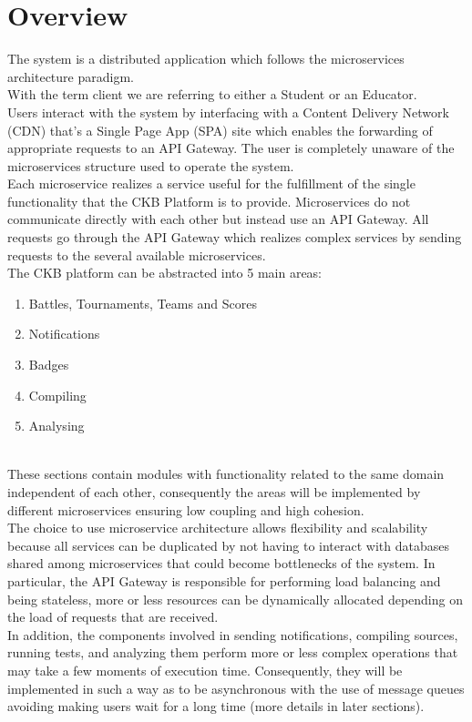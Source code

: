 \section{Overview}
The system is a distributed application which follows the microservices architecture paradigm.\\
With the term client we are referring to either a Student or an Educator.\\
Users interact with the system by interfacing with a Content Delivery Network (CDN) that's a Single Page App (SPA) site which enables the forwarding of appropriate requests to an API Gateway.
The user is completely unaware of the microservices structure used to operate the system.\\
Each microservice realizes a service useful for the fulfillment of the single functionality that the CKB Platform is to provide.
Microservices do not communicate directly with each other but instead use an API Gateway.
All requests go through the API Gateway which realizes complex services by sending requests to the several available microservices.\\
The CKB platform can be abstracted into 5 main areas:
\begin{enumerate}

    \item Battles, Tournaments, Teams and Scores
    \item Notifications
    \item Badges
    \item Compiling
    \item Analysing

\end{enumerate}

\\

These sections contain modules with functionality related to the same domain independent of each other, consequently the areas will be implemented by different microservices ensuring low coupling and high cohesion.\\
The choice to use microservice architecture allows flexibility and scalability because all services can be duplicated by not having to interact with databases shared among microservices that could become bottlenecks of the system.
In particular, the API Gateway is responsible for performing load balancing and being stateless, more or less resources can be dynamically allocated depending on the load of requests that are received.\\
In addition, the components involved in sending notifications, compiling sources, running tests, and analyzing them perform more or less complex operations that may take a few moments of execution time.
Consequently, they will be implemented in such a way as to be asynchronous with the use of message queues avoiding making users wait for a long time (more details in later sections).


